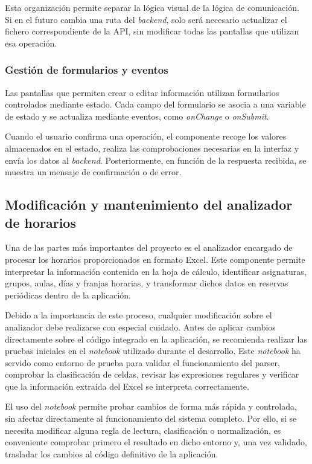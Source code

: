 Esta organización permite separar la lógica visual de la lógica de comunicación. Si en el futuro cambia una ruta del \textit{backend}, solo será necesario actualizar el fichero correspondiente de la API, sin modificar todas las pantallas que utilizan esa operación.

\subsubsection{Gestión de formularios y eventos}

Las pantallas que permiten crear o editar información utilizan formularios controlados mediante estado. Cada campo del formulario se asocia a una variable de estado y se actualiza mediante eventos, como \textit{onChange} o \textit{onSubmit}.

Cuando el usuario confirma una operación, el componente recoge los valores almacenados en el estado, realiza las comprobaciones necesarias en la interfaz y envía los datos al \textit{backend}. Posteriormente, en función de la respuesta recibida, se muestra un mensaje de confirmación o de error.

\subsection{Modificación y mantenimiento del analizador de horarios}

Una de las partes más importantes del proyecto es el analizador encargado de procesar los horarios proporcionados en formato Excel. Este componente permite interpretar la información contenida en la hoja de cálculo, identificar asignaturas, grupos, aulas, días y franjas horarias, y transformar dichos datos en reservas periódicas dentro de la aplicación.

Debido a la importancia de este proceso, cualquier modificación sobre el analizador debe realizarse con especial cuidado. Antes de aplicar cambios directamente sobre el código integrado en la aplicación, se recomienda realizar las pruebas iniciales en el \textit{notebook} utilizado durante el desarrollo. Este \textit{notebook} ha servido como entorno de prueba para validar el funcionamiento del parser, comprobar la clasificación de celdas, revisar las expresiones regulares y verificar que la información extraída del Excel se interpreta correctamente.

El uso del \textit{notebook} permite probar cambios de forma más rápida y controlada, sin afectar directamente al funcionamiento del sistema completo. Por ello, si se necesita modificar alguna regla de lectura, clasificación o normalización, es conveniente comprobar primero el resultado en dicho entorno y, una vez validado, trasladar los cambios al código definitivo de la aplicación.

